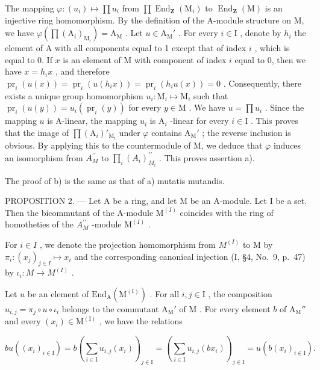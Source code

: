 The mapping \(\varphi : (u_i) \mapsto \prod u_i\) from \(\prod \operatorname{End}_{\mathbf{Z}}(\mathrm{M}_i)\) to \(\operatorname{End}_{\mathbf{Z}}(\mathrm{M})\) is an injective ring homomorphism. By the definition of the A-module structure on M, we have \(\varphi(\prod (\mathrm{A}_i)_{\mathrm{M}_i}) = \mathrm{A}_{\mathrm{M}}\) . Let \(u \in \mathrm{A}_{\mathrm{M}}'\) . For every \(i \in \mathrm{I}\) , denote by \(h_i\) the element of A with all components equal to 1 except that of index \(i\) , which is equal to 0. If \(x\) is an element of M with component of index \(i\) equal to 0, then we have \(x = h_i x\) , and therefore \(\operatorname{pr}_i(u(x)) = \operatorname{pr}_i(u(h_i x)) = \operatorname{pr}_i(h_i u(x)) = 0\) . Consequently, there exists a unique group homomorphism \(u_i: \mathrm{M}_i \mapsto \mathrm{M}_i\) such that \(\operatorname{pr}_i(u(y)) = u_i(\operatorname{pr}_i(y))\) for every \(y \in \mathrm{M}\) . We have \(u = \prod u_i\) . Since the mapping \(u\) is A-linear, the mapping \(u_i\) is \(\mathrm{A}_i\) -linear for every \(i \in \mathrm{I}\) . This proves that the image of \(\prod (\mathrm{A}_i)'_{\mathrm{M}_i}\) under \(\varphi\) contains \(\mathrm{A}_{\mathrm{M}}'\) ; the reverse inclusion is obvious. By applying this to the countermodule of M, we deduce that \(\varphi\) induces an isomorphism from \(A_{M}^{\prime \prime}\) to \(\prod_i(A_i)_{M_i}^{\prime \prime}\) . This proves assertion a).

The proof of b) is the same as that of a) mutatis mutandis.

PROPOSITION 2. --- Let A be a ring, and let M be an A-module. Let I be a set. Then the bicommutant of the A-module \(\mathrm{M}^{(I)}\) coincides with the ring of homotheties of the \(A_{M}^{\prime\prime}\) -module \(\mathrm{M}^{(I)}\) .

For \(i \in I\) , we denote the projection homomorphism from \(M^{(I)}\) to M by \(\pi_{i} : (x_{j})_{j \in I} \mapsto x_{i}\) and the corresponding canonical injection (I, §4, No.~9, p.~47) by \(\iota_{i} : M \to M^{(I)}\) .

Let \(u\) be an element of \(\mathrm{End}_{\mathrm{A}}(\mathrm{M}^{(\mathrm{I})})\) . For all \(i,j \in \mathrm{I}\) , the composition \(u_{i,j} = \pi_j \circ u \circ \iota_i\) belongs to the commutant \(\mathrm{A}_{\mathrm{M}}'\) of \(\mathrm{M}\) . For every element \(b\) of \(\mathrm{A}_{\mathrm{M}}''\) and every \((x_i) \in \mathrm{M}^{(\mathrm{I})}\) , we have the relations

\[
b u \left(\left(x _ {i}\right) _ {i \in \mathrm{I}}\right) = b \left(\sum_ {i \in \mathrm{I}} u _ {i, j} \left(x _ {i}\right)\right) _ {j \in \mathrm{I}} = \left(\sum_ {i \in \mathrm{I}} u _ {i, j} \left(b x _ {i}\right)\right) _ {j \in \mathrm{I}} = u \left(b \left(x _ {i}\right) _ {i \in \mathrm{I}}\right).
\]

